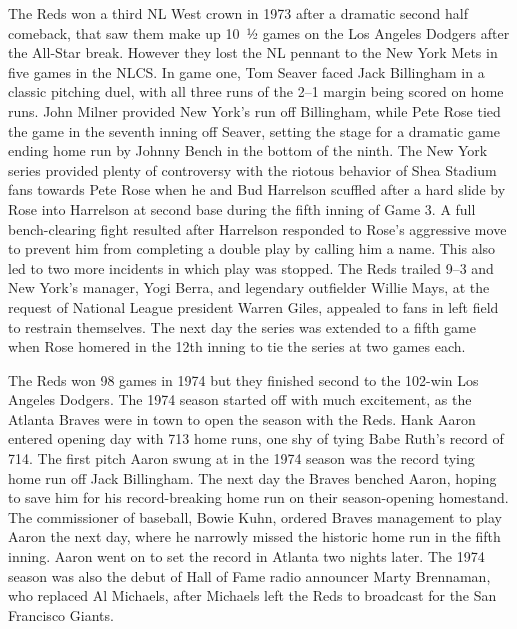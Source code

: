 The Reds won a third NL West crown in 1973 after a dramatic second half
comeback, that saw them make up ​10~1⁄2 games on the Los Angeles Dodgers
after the All-Star break. However they lost the NL pennant to the New
York Mets in five games in the NLCS. In game one, Tom Seaver faced Jack
Billingham in a classic pitching duel, with all three runs of the 2--1
margin being scored on home runs. John Milner provided New York's run
off Billingham, while Pete Rose tied the game in the seventh inning off
Seaver, setting the stage for a dramatic game ending home run by Johnny
Bench in the bottom of the ninth. The New York series provided plenty of
controversy with the riotous behavior of Shea Stadium fans towards Pete
Rose when he and Bud Harrelson scuffled after a hard slide by Rose into
Harrelson at second base during the fifth inning of Game 3. A full
bench-clearing fight resulted after Harrelson responded to Rose's
aggressive move to prevent him from completing a double play by calling
him a name. This also led to two more incidents in which play was
stopped. The Reds trailed 9--3 and New York's manager, Yogi Berra, and
legendary outfielder Willie Mays, at the request of National League
president Warren Giles, appealed to fans in left field to restrain
themselves. The next day the series was extended to a fifth game when
Rose homered in the 12th inning to tie the series at two games each.

The Reds won 98 games in 1974 but they finished second to the 102-win
Los Angeles Dodgers. The 1974 season started off with much excitement,
as the Atlanta Braves were in town to open the season with the Reds.
Hank Aaron entered opening day with 713 home runs, one shy of tying Babe
Ruth's record of 714. The first pitch Aaron swung at in the 1974 season
was the record tying home run off Jack Billingham. The next day the
Braves benched Aaron, hoping to save him for his record-breaking home
run on their season-opening homestand. The commissioner of baseball,
Bowie Kuhn, ordered Braves management to play Aaron the next day, where
he narrowly missed the historic home run in the fifth inning. Aaron went
on to set the record in Atlanta two nights later. The 1974 season was
also the debut of Hall of Fame radio announcer Marty Brennaman, who
replaced Al Michaels, after Michaels left the Reds to broadcast for the
San Francisco Giants.

